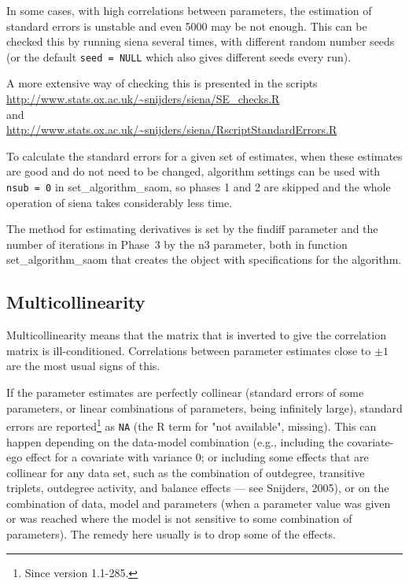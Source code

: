\documentclass[a4paper,fleqn,11pt]{article}
\newcommand{\+}{\, + \,}
\newcommand{\sfn}[1]{\textsf{#1}}
\begin{document}
In some cases, with high correlations between parameters,
the estimation of standard errors is unstable and even 5000 may be not enough.
This can be checked this by running \textsf{siena} several times, with different
random number seeds (or the default \texttt{seed = NULL} which also gives different
seeds every run).

A more extensive way of checking this is presented in the scripts\\
{\url{http://www.stats.ox.ac.uk/~snijders/siena/SE_checks.R}~} \\
and \\
{\url{http://www.stats.ox.ac.uk/~snijders/siena/RscriptStandardErrors.R}~}
\medskip


To calculate the standard errors for a
given set of estimates, when these estimates are good and do not need to be changed,
algorithm settings can be used with \texttt{nsub = 0}
in \textsf{set\_algorithm\_saom}, so phases 1 and 2 are
skipped and the whole operation of \textsf{siena} takes considerably less time.
\medskip

The method for estimating derivatives is set
by the \sfn{findiff} parameter and the number of iterations in Phase~3
by the \sfn{n3} parameter, both in function \textsf{set\_algorithm\_saom}
that creates the object with specifications for the algorithm.

\subsection{Multicollinearity}

Multicollinearity means that the matrix that is inverted
to give the correlation matrix is ill-conditioned.
Correlations between parameter estimates
close to $\pm 1$ are the most usual signs of this.

If the parameter estimates are perfectly collinear
(standard errors of some parameters, or linear combinations
of parameters, being infinitely large), standard errors
are reported\footnote{Since version 1.1-285.}
as \texttt{NA} (the R term for "not available", missing).
This can happen depending on the data-model combination
(e.g., including the covariate-ego effect for a covariate with variance 0;
or including some effects that are collinear for any data set,
such as the combination of outdegree, transitive triplets,
outdegree activity, and balance effects --- see Snijders, 2005),
or on the combination of data, model and parameters (when a parameter
value was given or was reached where the model is not sensitive to some
combination of parameters).
The remedy here usually is to drop some of the effects.
\medskip
\end{document}
